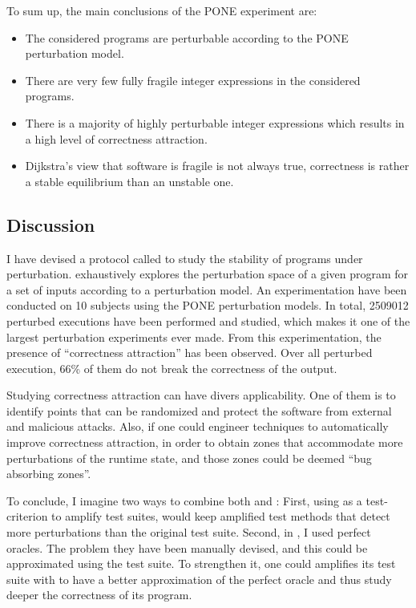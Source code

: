 \begin{mdframed}
To sum up, the main conclusions of the PONE experiment are:
\begin{itemize}
	\item The considered programs are perturbable according to the PONE perturbation model.
	\item There are very few fully fragile integer expressions in the considered programs.
	\item There is a majority of highly perturbable integer expressions which results in a high level of correctness attraction.
	\item Dijkstra's view that software is fragile is not always true, correctness is rather a stable equilibrium than an unstable one.
\end{itemize}
\end{mdframed}

\subsection{Discussion}
\label{subsec:transversal-contributions:correctness:conclusion}

I have devised a protocol called \perturb to study the stability of programs under perturbation.
\perturb exhaustively explores the perturbation space of a given program for a set of inputs according to a perturbation model.
An experimentation have been conducted on 10 subjects using the PONE perturbation models.
In total, 2509012 perturbed executions have been performed and studied, which makes it one of the largest perturbation experiments ever made.
From this experimentation, the presence of ``correctness attraction'' has been observed. Over all perturbed execution, 66\% of them do not break the correctness of the output. 

Studying correctness attraction can have divers applicability.
One of them is to identify points that can be randomized and protect the software from external and malicious attacks.
Also, if one could engineer techniques to automatically improve correctness attraction, in order to obtain zones that accommodate more perturbations of the runtime state, and those zones could be deemed ``bug absorbing zones''.

To conclude, I imagine two ways to combine both \dspot and \perturb:
First, using \perturb as a test-criterion to amplify test suites, \ie \dspot would keep amplified test methods that detect more perturbations than the original test suite.
Second, in \perturb, I used perfect oracles.
The problem they have been manually devised, and this could be approximated using the test suite.
To strengthen it, one could amplifies its test suite with \dspot to have a better approximation of the perfect oracle and thus study deeper the correctness of its program.

